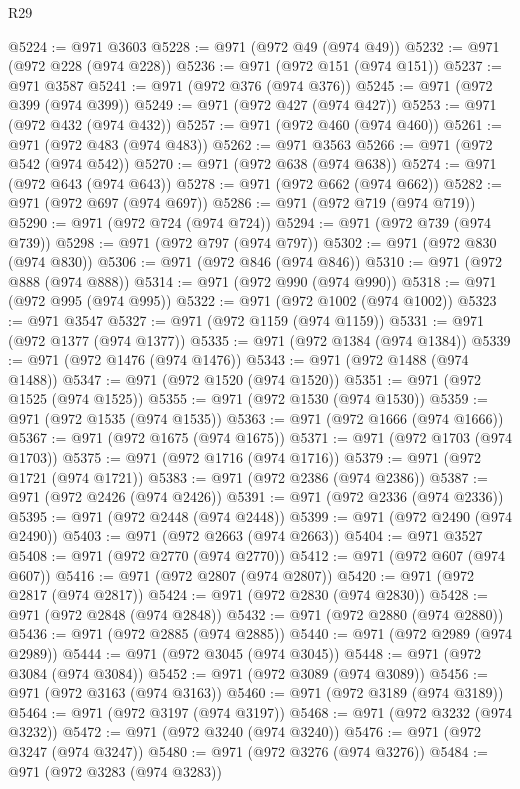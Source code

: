 \begin{lexlean}{R29}
\begin{coremodule}
@5224 := @971 @3603
@5228 := @971 (@972 @49 (@974 @49))
@5232 := @971 (@972 @228 (@974 @228))
@5236 := @971 (@972 @151 (@974 @151))
@5237 := @971 @3587
@5241 := @971 (@972 @376 (@974 @376))
@5245 := @971 (@972 @399 (@974 @399))
@5249 := @971 (@972 @427 (@974 @427))
@5253 := @971 (@972 @432 (@974 @432))
@5257 := @971 (@972 @460 (@974 @460))
@5261 := @971 (@972 @483 (@974 @483))
@5262 := @971 @3563
@5266 := @971 (@972 @542 (@974 @542))
@5270 := @971 (@972 @638 (@974 @638))
@5274 := @971 (@972 @643 (@974 @643))
@5278 := @971 (@972 @662 (@974 @662))
@5282 := @971 (@972 @697 (@974 @697))
@5286 := @971 (@972 @719 (@974 @719))
@5290 := @971 (@972 @724 (@974 @724))
@5294 := @971 (@972 @739 (@974 @739))
@5298 := @971 (@972 @797 (@974 @797))
@5302 := @971 (@972 @830 (@974 @830))
@5306 := @971 (@972 @846 (@974 @846))
@5310 := @971 (@972 @888 (@974 @888))
@5314 := @971 (@972 @990 (@974 @990))
@5318 := @971 (@972 @995 (@974 @995))
@5322 := @971 (@972 @1002 (@974 @1002))
@5323 := @971 @3547
@5327 := @971 (@972 @1159 (@974 @1159))
@5331 := @971 (@972 @1377 (@974 @1377))
@5335 := @971 (@972 @1384 (@974 @1384))
@5339 := @971 (@972 @1476 (@974 @1476))
@5343 := @971 (@972 @1488 (@974 @1488))
@5347 := @971 (@972 @1520 (@974 @1520))
@5351 := @971 (@972 @1525 (@974 @1525))
@5355 := @971 (@972 @1530 (@974 @1530))
@5359 := @971 (@972 @1535 (@974 @1535))
@5363 := @971 (@972 @1666 (@974 @1666))
@5367 := @971 (@972 @1675 (@974 @1675))
@5371 := @971 (@972 @1703 (@974 @1703))
@5375 := @971 (@972 @1716 (@974 @1716))
@5379 := @971 (@972 @1721 (@974 @1721))
@5383 := @971 (@972 @2386 (@974 @2386))
@5387 := @971 (@972 @2426 (@974 @2426))
@5391 := @971 (@972 @2336 (@974 @2336))
@5395 := @971 (@972 @2448 (@974 @2448))
@5399 := @971 (@972 @2490 (@974 @2490))
@5403 := @971 (@972 @2663 (@974 @2663))
@5404 := @971 @3527
@5408 := @971 (@972 @2770 (@974 @2770))
@5412 := @971 (@972 @607 (@974 @607))
@5416 := @971 (@972 @2807 (@974 @2807))
@5420 := @971 (@972 @2817 (@974 @2817))
@5424 := @971 (@972 @2830 (@974 @2830))
@5428 := @971 (@972 @2848 (@974 @2848))
@5432 := @971 (@972 @2880 (@974 @2880))
@5436 := @971 (@972 @2885 (@974 @2885))
@5440 := @971 (@972 @2989 (@974 @2989))
@5444 := @971 (@972 @3045 (@974 @3045))
@5448 := @971 (@972 @3084 (@974 @3084))
@5452 := @971 (@972 @3089 (@974 @3089))
@5456 := @971 (@972 @3163 (@974 @3163))
@5460 := @971 (@972 @3189 (@974 @3189))
@5464 := @971 (@972 @3197 (@974 @3197))
@5468 := @971 (@972 @3232 (@974 @3232))
@5472 := @971 (@972 @3240 (@974 @3240))
@5476 := @971 (@972 @3247 (@974 @3247))
@5480 := @971 (@972 @3276 (@974 @3276))
@5484 := @971 (@972 @3283 (@974 @3283))

\end{coremodule}
\end{lexlean}
